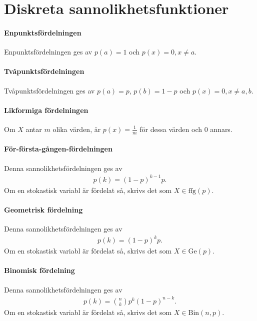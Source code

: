 \section{Diskreta sannolikhetsfunktioner}

\paragraph{Enpunktsfördelningen}
Enpunktsfördelningen ges av $p(a) = 1$ och $p(x) = 0, x\neq a$.

\paragraph{Tvåpunktsfördelningen}
Tvåpunktsfördelningen ges av $p(a) = p$, $p(b) = 1 - p$ och $p(x) = 0, x\neq a, b$.

\paragraph{Likformiga fördelningen}
Om $X$ antar $m$ olika värden, är $p(x) = \frac{1}{m}$ för dessa värden och $0$ annars.

\paragraph{För-första-gången-fördelningen}
Denna sannolikhetsfördelningen ges av
\begin{align*}
	p(k) = (1 - p)^{k - 1}p.
\end{align*}
Om en stokastisk variabl är fördelat så, skrivs det som $X\in\text{ffg}(p)$.

\paragraph{Geometrisk fördelning}
Denna sannolikhetsfördelningen ges av
\begin{align*}
	p(k) = (1 - p)^{k}p.
\end{align*}
Om en stokastisk variabl är fördelat så, skrivs det som $X\in\text{Ge}(p)$.

\paragraph{Binomisk fördelning}
Denna sannolikhetsfördelningen ges av
\begin{align*}
	p(k) = \binom{n}{k}p^{k}(1 - p)^{n - k}.
\end{align*}
Om en stokastisk variabl är fördelat så, skrivs det som $X\in\text{Bin}(n, p)$.

